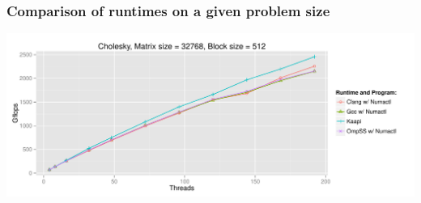 \documentclass[xcolor={usenames,dvipsnames,svgnames,table}, aspectratio=43]{beamer}
\begin{document}







\begin{frame}
  \frametitle{Comparison of runtimes on a given problem size}
  \begin{center}
    \includegraphics[width=\textwidth]{graph/dpotrf_scale_32k.pdf}
  \end{center}
\end{frame}
\end{document}
